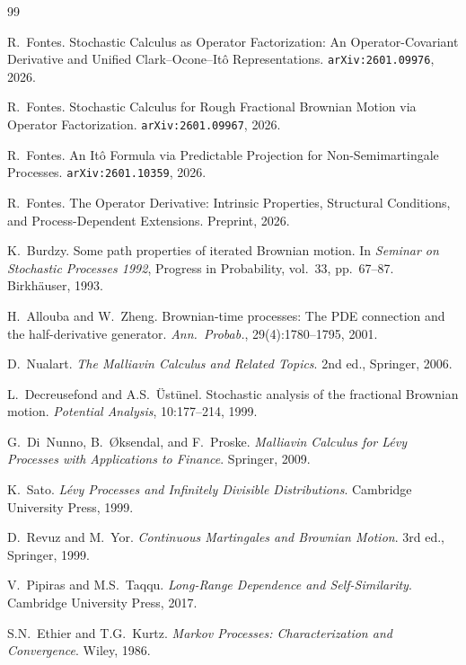 \documentclass[12pt]{article}
\theoremstyle{plain}
\theoremstyle{definition}
\theoremstyle{remark}
\begin{document}
\begin{thebibliography}{99}

R.~Fontes.
\newblock Stochastic Calculus as Operator Factorization: An Operator-Covariant Derivative and Unified Clark--Ocone--It\^{o} Representations.
\newblock \texttt{arXiv:2601.09976}, 2026.

R.~Fontes.
\newblock Stochastic Calculus for Rough Fractional Brownian Motion via Operator Factorization.
\newblock \texttt{arXiv:2601.09967}, 2026.

R.~Fontes.
\newblock An It\^{o} Formula via Predictable Projection for Non-Semimartingale Processes.
\newblock \texttt{arXiv:2601.10359}, 2026.

R.~Fontes.
\newblock The Operator Derivative: Intrinsic Properties, Structural Conditions, and Process-Dependent Extensions.
\newblock Preprint, 2026.

K.~Burdzy.
\newblock Some path properties of iterated {B}rownian motion.
\newblock In \emph{Seminar on Stochastic Processes 1992}, Progress in Probability, vol.~33, pp.~67--87.
\newblock Birkh\"{a}user, 1993.

H.~Allouba and W.~Zheng.
\newblock Brownian-time processes: The {PDE} connection and the half-derivative generator.
\newblock \emph{Ann.\ Probab.}, 29(4):1780--1795, 2001.

D.~Nualart.
\newblock \emph{The Malliavin Calculus and Related Topics}.
\newblock 2nd ed., Springer, 2006.

L.~Decreusefond and A.S.~\"{U}st\"{u}nel.
\newblock Stochastic analysis of the fractional {B}rownian motion.
\newblock \emph{Potential Analysis}, 10:177--214, 1999.

G.~Di~Nunno, B.~{\O}ksendal, and F.~Proske.
\newblock \emph{Malliavin Calculus for L\'{e}vy Processes with Applications to Finance}.
\newblock Springer, 2009.

K.~Sato.
\newblock \emph{L\'{e}vy Processes and Infinitely Divisible Distributions}.
\newblock Cambridge University Press, 1999.

D.~Revuz and M.~Yor.
\newblock \emph{Continuous Martingales and Brownian Motion}.
\newblock 3rd ed., Springer, 1999.

V.~Pipiras and M.S.~Taqqu.
\newblock \emph{Long-Range Dependence and Self-Similarity}.
\newblock Cambridge University Press, 2017.

S.N.~Ethier and T.G.~Kurtz.
\newblock \emph{Markov Processes: Characterization and Convergence}.
\newblock Wiley, 1986.

\end{thebibliography}
\end{document}
